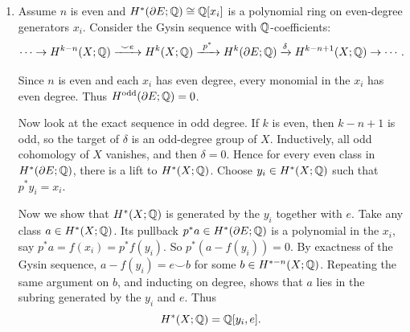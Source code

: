 \documentclass[12pt]{article}  %
\begin{document}
\begin{solution}
\begin{enumerate}
    \item Assume $n$ is even and $H^*(\partial E;\mathbb{Q}) \cong \mathbb{Q}[x_i]$ is a polynomial ring on even-degree generators $x_i$. Consider the Gysin sequence with $\mathbb{Q}$-coefficients:
    \[
    \cdots \to H^{k-n}(X;\Q) \xrightarrow{\ \smile e\ } H^k(X;\Q) \xrightarrow{\ p^*\ } H^k(\partial E;\Q) \xrightarrow{\delta} H^{k-n+1}(X;\Q) \to \cdots.
    \]

    Since $n$ is even and each $x_i$ has even degree, every monomial in the $x_i$ has even degree. Thus $H^{\text{odd}}(\partial E;\mathbb{Q}) = 0$.

    Now look at the exact sequence in odd degree. If $k$ is even, then $k-n+1$ is odd, so the target of $\delta$ is an odd-degree group of $X$. Inductively, all odd cohomology of $X$ vanishes, and then $\delta = 0$. Hence for every even class in $H^*(\partial E;\mathbb{Q})$, there is a lift to $H^*(X;\mathbb{Q})$. Choose $y_i \in H^*(X;\mathbb{Q})$ such that $p^*y_i = x_i$. 
    
    Now we show that $H^*(X;\mathbb{Q})$ is generated by the $y_i$ together with $e$. Take any class $a \in H^*(X;\mathbb{Q})$. Its pullback $p^*a \in H^*(\partial E;\mathbb{Q})$ is a polynomial in the $x_i$, say
    $p^*a = f(x_i) = p^*f(y_i)$.
    So $p^*(a - f(y_i)) = 0$.
    By exactness of the Gysin sequence, $a - f(y_i) = e \smile b$ for some $b \in H^{*-n}(X;\mathbb{Q})$.
    Repeating the same argument on $b$, and inducting on degree, shows that $a$ lies in the subring generated by the $y_i$ and $e$. Thus
    \[
    H^*(X;\mathbb{Q}) = \mathbb{Q}[y_i,e].
    \]
\end{enumerate}
\end{solution}
\end{document}
